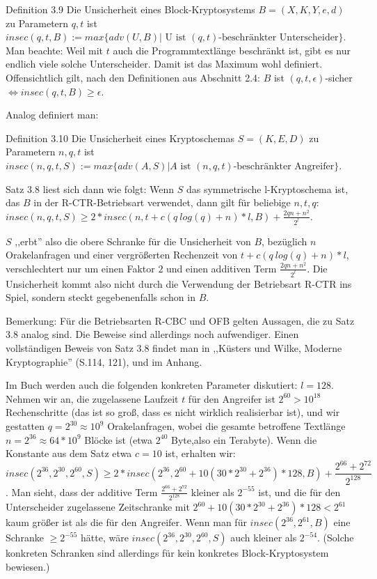 \documentclass[a4paper]{article}
\begin{document}
\begin{multicols}{3}
    Definition 3.9 Die Unsicherheit eines Block-Kryptosystems $B=(X,K,Y,e,d)$ zu Parametern $q,t$ ist $insec(q,t,B) := max\{adv(U,B)|\text{ U ist } (q,t) \text{-beschränkter Unterscheider}\}$.
    Man beachte: Weil mit $t$ auch die Programmtextlänge beschränkt ist, gibt es nur endlich viele solche Unterscheider. Damit ist das Maximum wohl definiert. Offensichtlich gilt, nach den Definitionen aus Abschnitt 2.4: $B$ ist $(q,t,\epsilon)$-sicher $\Leftrightarrow insec(q,t,B)\geq\epsilon$.

    Analog definiert man:

    Definition 3.10 Die Unsicherheit eines Kryptoschemas $S=(K,E,D)$ zu Parametern $n,q,t$ ist $insec(n,q,t,S):=max\{adv(A,S)|A \text{ ist }(n,q,t)\text{-beschränkter Angreifer}\}$.

    Satz 3.8 liest sich dann wie folgt: Wenn $S$ das symmetrische l-Kryptoschema ist, das $B$ in der R-CTR-Betriebsart verwendet, dann gilt für beliebige $n,t,q$: $insec(n,q,t,S)\geq 2 * insec(n,t+c(q\ log(q) +n)*l,B) +\frac{2qn+n^2}{2^l}$.

    $S$ ,,erbt'' also die obere Schranke für die Unsicherheit von $B$, bezüglich $n$ Orakelanfragen und einer vergrößerten Rechenzeit von $t+c(q\ log(q) +n)*l$, verschlechtert nur um einen Faktor $2$ und einen additiven Term $\frac{2qn+n^2}{2^l}$. Die Unsicherheit kommt also nicht durch die Verwendung der Betriebsart R-CTR ins Spiel, sondern steckt gegebenenfalls schon in $B$.

    Bemerkung: Für die Betriebsarten R-CBC und OFB gelten Aussagen, die zu Satz 3.8 analog sind. Die Beweise sind allerdings noch aufwendiger. Einen vollständigen Beweis von Satz 3.8 findet man in ,,Küsters und Wilke, Moderne Kryptographie'' (S.114, 121), und im Anhang.

    Im Buch werden auch die folgenden konkreten Parameter diskutiert: $l=128$. Nehmen wir an, die zugelassene Laufzeit $t$ für den Angreifer ist $2^{60} > 10^{18}$ Rechenschritte (das ist so groß, dass es nicht wirklich realisierbar ist), und wir gestatten $q=2^{30} \approx 10^{9}$ Orakelanfragen, wobei die gesamte betroffene Textlänge $n=2^{36}\approx 64*10^9$ Blöcke ist (etwa $2^{40}$ Byte,also ein Terabyte). Wenn die Konstante aus dem Satz etwa $c=10$ ist, erhalten wir: $$insec(2^{36}, 2^{30}, 2^{60},S)\geq 2*insec(2^{36}, 2^{60}+ 10(30*2^{30}+ 2^{36})* 128 ,B) +\frac{2^{66} + 2^{72}}{2^{128}}$$.
    Man sieht, dass der additive Term $\frac{2^{66} +2^{72}}{2^{128}}$ kleiner als $2^{-55}$ ist, und die für den Unterscheider zugelassene Zeitschranke mit $2^{60} + 10(30* 2^{30}+2^{36})*128 < 2^{61}$ kaum größer ist als die für den Angreifer. Wenn man für $insec(2^{36}, 2^{61} ,B)$ eine Schranke $\geq 2^{-55}$ hätte, wäre $insec(2^{36}, 2^{30}, 2^{60},S)$ auch kleiner als $2^{-54}$. (Solche konkreten Schranken sind allerdings für kein konkretes Block-Kryptosystem bewiesen.)


\end{multicols}
\end{document}
